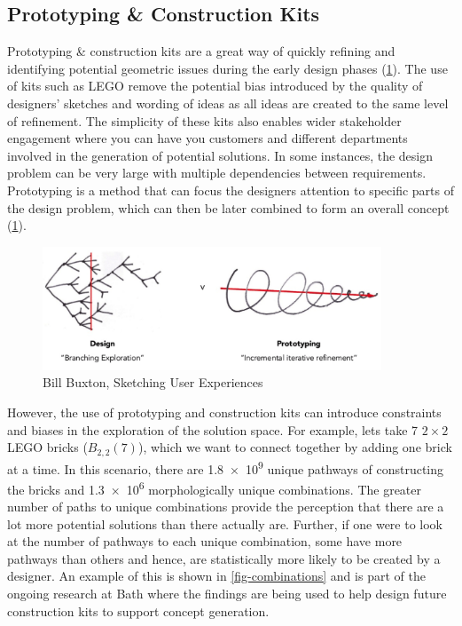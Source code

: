 \subsection{Prototyping \& Construction Kits}

Prototyping \& construction kits are a great way of quickly refining and identifying potential geometric issues during the early design phases (\cref{fig-why-prototype}). The use of kits such as LEGO\texttrademark{} remove the potential bias introduced by the quality of designers' sketches and wording of ideas as all ideas are created to the same level of refinement. The simplicity of these kits also enables wider stakeholder engagement where you can have you customers and different departments involved in the generation of potential solutions. In some instances, the design problem can be very large with multiple dependencies between requirements. Prototyping is a method that can focus the designers attention to specific parts of the design problem, which can then be later combined to form an overall concept (\cref{fig-why-prototype}).

\begin{figure}[h!]
\centering
\includegraphics[width=0.9\textwidth]{figs/whyprototype.png}
\caption[Bill Buxton, Sketching User Experiences]{Bill Buxton, Sketching User Experiences~\citep{buxton2010}}
\label{fig-why-prototype}
\end{figure}

However, the use of prototyping and construction kits can introduce constraints and biases in the exploration of the solution space. 
For example, lets take 7 $2\times2$ LEGO\texttrademark{} bricks ($B_{2,2}(7)$), which we want to connect together by adding one brick at a time. In this scenario, there are \num{1.8e9} unique pathways of constructing the bricks and \num{1.3e6} morphologically unique combinations. The greater number of paths to unique combinations provide the perception that there are a lot more potential solutions than there actually are. Further, if one were to look at the number of pathways to each unique combination, some have more pathways than others and hence, are statistically more likely to be created by a designer. An example of this is shown in \cref{fig-combinations} and is part of the ongoing research at Bath where the findings are being used to help design future construction kits to support concept generation\cite{design2018}.

